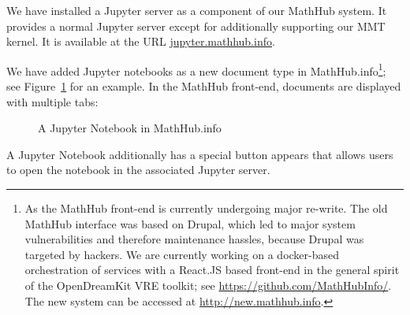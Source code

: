 We have installed a Jupyter server as a component of our MathHub system.
It provides a normal Jupyter server except for additionally supporting our MMT kernel.
It is available at the URL \url{jupyter.mathhub.info}.

We have added Jupyter notebooks as a new document type in MathHub.info\footnote{As the MathHub front-end is currently undergoing major re-write.
  The old MathHub interface was based on Drupal, which led to major system vulnerabilities and therefore maintenance hassles, because Drupal was targeted by hackers.
  We are currently working on a docker-based orchestration of services with a React.JS based front-end in the general spirit of the OpenDreamKit VRE toolkit; see \url{https://github.com/MathHubInfo/}. The new system can be accessed at \url{http://new.mathhub.info}.}; see Figure~\ref{fig:mathhub-NB} for an example. In the MathHub front-end, documents are displayed with multiple tabs: 

\begin{figure}[ht]\centering
  \caption{A Jupyter Notebook in MathHub.info}\label{fig:mathhub-NB}
\end{figure}


A Jupyter Notebook additionally has a special button appears that allows users to open the notebook in the associated Jupyter server.





